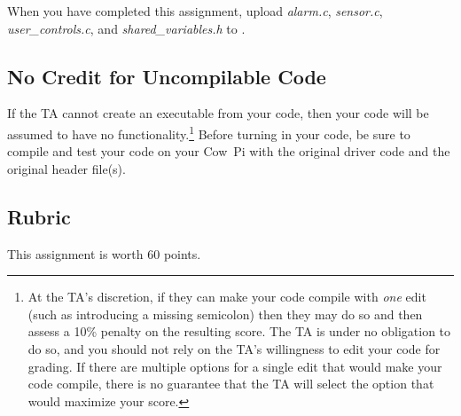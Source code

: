 When you have completed this assignment, upload \textit{alarm.c}, \textit{sensor.c}, \textit{user\_controls.c}, and \textit{shared\_variables.h} to \filesubmission.

\subsection*{No Credit for Uncompilable Code}
If the TA cannot create an executable from your code, then your code will be assumed to have no functionality.\footnote{
    At the TA's discretion, if they can make your code compile with \textit{one} edit (such as introducing a missing semicolon) then they may do so and then assess a 10\% penalty on the resulting score.
    The TA is under no obligation to do so, and you should not rely on the TA's willingness to edit your code for grading.
    If there are multiple options for a single edit that would make your code compile, there is no guarantee that the TA will select the option that would maximize your score.
}
Before turning in your code, be sure to compile and test your code on your Cow~Pi with the original driver code and the original header file(s).

\interruptlablatepolicy

\subsection*{Rubric}

This assignment is worth 60 points.

